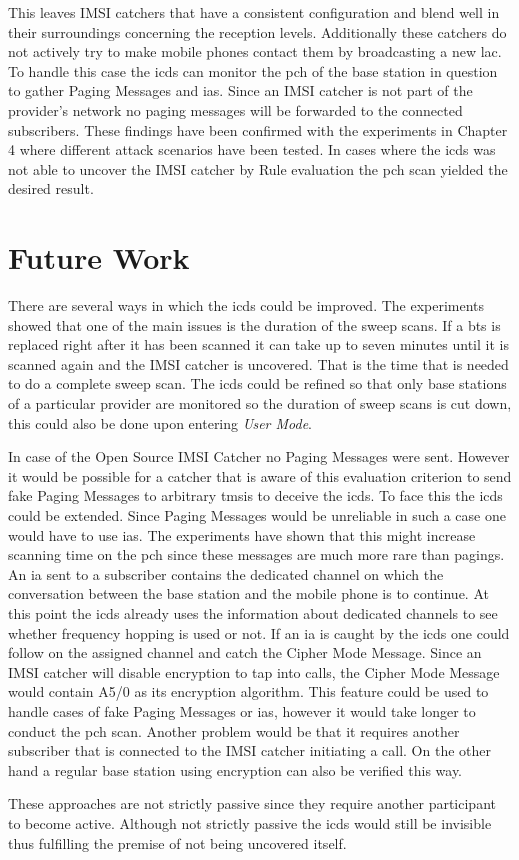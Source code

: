 This leaves IMSI catchers that have a consistent configuration and blend well in their surroundings concerning the reception levels.
Additionally these catchers do not actively try to make mobile phones contact them by broadcasting a new \gls{lac}.
To handle this case the \gls{icds} can monitor the \gls{pch} of the base station in question to gather Paging Messages and \glspl{ia}.
Since an IMSI catcher is not part of the provider's network no paging messages will be forwarded to the connected subscribers.
These findings have been confirmed with the experiments in Chapter 4 where different attack scenarios have been tested.
In cases where the \gls{icds} was not able to uncover the IMSI catcher by Rule evaluation the \gls{pch} scan yielded the desired result.

\section{Future Work}
There are several ways in which the \gls{icds} could be improved.
The experiments showed that one of the main issues is the duration of the sweep scans.
If a \gls{bts} is replaced right after it has been scanned it can take up to seven minutes until it is scanned again and the IMSI catcher is uncovered.
That is the time that is needed to do a complete sweep scan.
The \gls{icds} could be refined so that only base stations of a particular provider are monitored so the duration of sweep scans is cut down, this could also be done upon entering \emph{User Mode}.

In case of the Open Source IMSI Catcher no Paging Messages were sent.
However it would be possible for a catcher that is aware of this evaluation criterion to send fake Paging Messages to arbitrary \glspl{tmsi} to deceive the \gls{icds}.
To face this the \gls{icds} could be extended.
Since Paging Messages would be unreliable in such a case one would have to use \glspl{ia}.
The experiments have shown that this might increase scanning time on the \gls{pch} since these messages are much more rare than pagings.
An \gls{ia} sent to a subscriber contains the dedicated channel on which the conversation between the base station and the mobile phone is to continue.
At this point the \gls{icds} already uses the information about dedicated channels to see whether frequency hopping is used or not.
If an \gls{ia} is caught by the \gls{icds} one could follow on the assigned channel and catch the Cipher Mode Message.
Since an IMSI catcher will disable encryption to tap into calls, the Cipher Mode Message would contain A5/0 as its encryption algorithm.
This feature could be used to handle cases of fake Paging Messages or \glspl{ia}, however it would take longer to conduct the \gls{pch} scan.
Another problem would be that it requires another subscriber that is connected to the IMSI catcher initiating a call.
On the other hand a regular base station using encryption can also be verified this way.

These approaches are not strictly passive since they require another participant to become active.
Although not strictly passive the \gls{icds} would still be invisible thus fulfilling the premise of not being uncovered itself.

